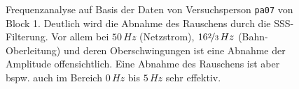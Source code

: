 \documentclass[doc,a4paper,12pt]{apa6}
\begin{document}
\begin{figure}
  \centering
  \begin{subfigure}[c]{0.8\textwidth}
    \label{img:freq-analy-raw}
  \end{subfigure}\vspace*{3mm}
  \begin{subfigure}[c]{0.8\textwidth}
    \label{img:freq-analy-sss}
  \end{subfigure}
  \vspace*{3mm}
  \caption[Frequenzanalyse auf Basis eines Blocks]{Frequenzanalyse auf Basis der Daten von Versuchsperson \texttt{pa07} von Block 1. Deutlich wird die Abnahme des Rauschens durch die SSS-Filterung. Vor allem bei $50\,Hz$ (Netzstrom), $16\nicefrac{2}{3}\,Hz$ (Bahn-Oberleitung) und deren Oberschwingungen ist eine Abnahme der Amplitude offensichtlich. Eine Abnahme des Rauschens ist aber bspw. auch im Bereich $0\,Hz$ bis $5\,Hz$ sehr effektiv.}
  \label{img:freq-analy}
\end{figure}
\end{document}
